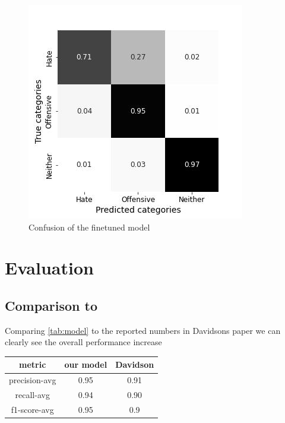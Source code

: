 \documentclass[11pt,a4paper]{article}
\begin{document}
\begin{figure}[h]
 \includegraphics[width=\linewidth]{./tables-figures/model_confusion.jpg}
  \caption{Confusion of the finetuned model}
  \label{fig:model_confusion}
\end{figure}

\section{Evaluation}
\subsection{Comparison to \cite{auto_hatespeech}}
Comparing \ref{tab:model} to the reported numbers in Davidsons paper we can clearly see the overall performance increase
\begin{table}[h]
  \begin{tabular}{c | c  c}
    metric & our model & Davidson \\
    \hline
    precision-avg &  0.95 & 0.91 \\
    recall-avg &  0.94 & 0.90 \\  
    f1-score-avg &  0.95 & 0.9 \\
  \end{tabular}
\end{table}
\end{document}
